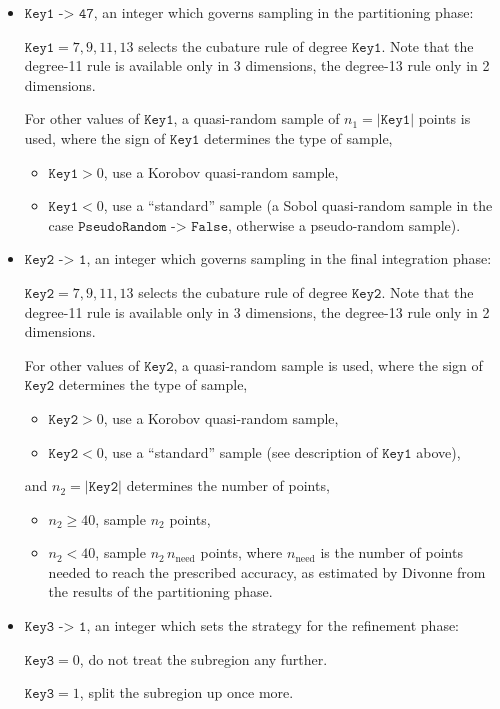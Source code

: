 \documentclass[12pt]{article}
\newcommand\nneed{n_{\text{need}}}
\newcommand\Code[1]{\ensuremath{\texttt{#1}}}
\newcommand\Option[2]{\item\Code{#1 -> #2},}
\begin{document}
\begin{itemize}
\Option{Key1}{47}
an integer which governs sampling in the partitioning phase:

$\Code{Key1} = 7, 9, 11, 13$ selects the cubature rule of degree 
\Code{Key1}.  Note that the degree-11 rule is available only in 3
dimensions, the degree-13 rule only in 2 dimensions.

For other values of \Code{Key1}, a quasi-random sample of
$n_1 = |\Code{Key1}|$ points is used, where the sign of \Code{Key1}
determines the type of sample,
\begin{itemize}
\item
$\Code{Key1} > 0$, use a Korobov quasi-random sample,
\item
$\Code{Key1} < 0$, use a ``standard'' sample
(a Sobol quasi-random sample in the case \Code{PseudoRandom -> False},
otherwise a pseudo-random sample).
\end{itemize}

\Option{Key2}{1}
an integer which governs sampling in the final integration phase:

$\Code{Key2} = 7, 9, 11, 13$ selects the cubature rule of degree 
\Code{Key2}.  Note that the degree-11 rule is available only in 3
dimensions, the degree-13 rule only in 2 dimensions.

For other values of \Code{Key2}, a quasi-random sample is used, where 
the sign of \Code{Key2} determines the type of sample,
\begin{itemize}
\item
$\Code{Key2} > 0$, use a Korobov quasi-random sample,
\item
$\Code{Key2} < 0$, use a ``standard'' sample
(see description of \Code{Key1} above),
\end{itemize}
and $n_2 = |\Code{Key2}|$ determines the number of points,
\begin{itemize}
\item
$n_2\geqslant 40$, sample $n_2$ points,
\item
$n_2 < 40$, sample $n_2\,\nneed$ points, where $\nneed$ is the number of
points needed to reach the prescribed accuracy, as estimated by Divonne 
from the results of the partitioning phase.
\end{itemize}

\Option{Key3}{1}
an integer which sets the strategy for the refinement phase:

$\Code{Key3} = 0$, do not treat the subregion any further.

$\Code{Key3} = 1$, split the subregion up once more.


\end{itemize}
\end{document}
